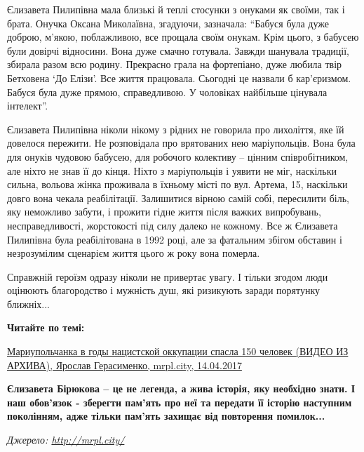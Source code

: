 
Єлизавета Пилипівна мала близькі й теплі стосунки з онуками як своїми, так і
брата. Онучка Оксана Миколаївна, згадуючи, зазначала: \enquote{Бабуся була дуже доброю,
м'якою, поблажливою, все прощала своїм онукам. Крім цього, з бабусею були
довірчі відносини. Вона дуже смачно готувала. Завжди шанувала традиції, збирала
разом всю родину. Прекрасно грала на фортепіано, дуже любила твір Бетховена \enquote{До
Елізи}. Все життя працювала. Сьогодні це назвали б кар'єризмом. Бабуся була
дуже прямою, справедливою. У чоловіках найбільше цінувала інтелект}.


Єлизавета Пилипівна ніколи нікому з рідних не говорила про лихоліття, яке їй
довелося пережити. Не розповідала про врятованих нею маріупольців. Вона була
для онуків чудовою бабусею, для робочого колективу – цінним співробітником, але
ніхто не знав її до кінця. Ніхто з маріупольців і уявити не міг, наскільки
сильна, вольова жінка проживала в їхньому місті по вул. Артема, 15, наскільки
довго вона чекала реабілітації. Залишитися вірною самій собі, пересилити біль,
яку неможливо забути, і прожити гідне життя після важких випробувань,
несправедливості, жорстокості під силу далеко не кожному. Все ж Єлизавета
Пилипівна була реабілітована в 1992 році, але за фатальним збігом обставин і
незрозумілим сценарієм життя цього ж року вона померла.


Справжній героїзм одразу ніколи не привертає увагу. І тільки згодом люди
оцінюють благородство і мужність душ, які ризикують заради порятунку ближніх...


\textbf{Читайте по темі:} 

\href{https://mrpl.city/news/view/mariupolchanka-v-gody-natsistskoj-okkupatsii-spasla-150-chelovek-video}{%
Мариупольчанка в годы нацистской оккупации спасла 150 человек (ВИДЕО ИЗ АРХИВА), %
Ярослав Герасименко, mrpl.city, 14.04.2017}

\textbf{Єлизавета Бірюкова – це не легенда, а жива історія, яку необхідно знати. І наш
обов'язок - зберегти пам'ять про неї та передати її історію наступним
поколінням, адже тільки пам'ять захищає від повторення помилок...}

\emph{Джерело: \url{http://mrpl.city/}}

